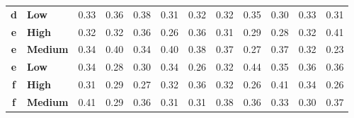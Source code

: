 \documentclass[mathematics,article,submit,moreauthors,pdftex]{mdpi}
\begin{document}
\begin{table}[H]
\begin{tabular}{@{}clrrrrrrrrrr@{}}
\textbf{d}     & \textbf{Low}       & 0.33                               & 0.36                               & 0.38                               & 0.31                               & 0.32                               & 0.32                               & 0.35                               & 0.30                               & 0.33                               & 0.31                                \\
\rowcolor[HTML]{D9D9D9} 
\textbf{e}     & \textbf{High}      & 0.32                               & 0.32                               & 0.36                               & 0.26                               & 0.36                               & 0.31                               & 0.29                               & 0.28                               & 0.32                               & 0.41                                \\
\rowcolor[HTML]{D9D9D9} 
\textbf{e}     & \textbf{Medium}    & 0.34                               & 0.40                               & 0.34                               & 0.40                               & 0.38                               & 0.37                               & 0.27                               & 0.37                               & 0.32                               & 0.23                                \\
\rowcolor[HTML]{D9D9D9} 
\textbf{e}     & \textbf{Low}       & 0.34                               & 0.28                               & 0.30                               & 0.34                               & 0.26                               & 0.32                               & 0.44                               & 0.35                               & 0.36                               & 0.36                                \\
\textbf{f}     & \textbf{High}      & 0.31                               & 0.29                               & 0.27                               & 0.32                               & 0.36                               & 0.32                               & 0.26                               & 0.41                               & 0.34                               & 0.26                                \\
\textbf{f}     & \textbf{Medium}    & 0.41                               & 0.29                               & 0.36                               & 0.31                               & 0.31                               & 0.38                               & 0.36                               & 0.33                               & 0.30                               & 0.37                                \\

\end{tabular}
\end{table}
\end{document}
